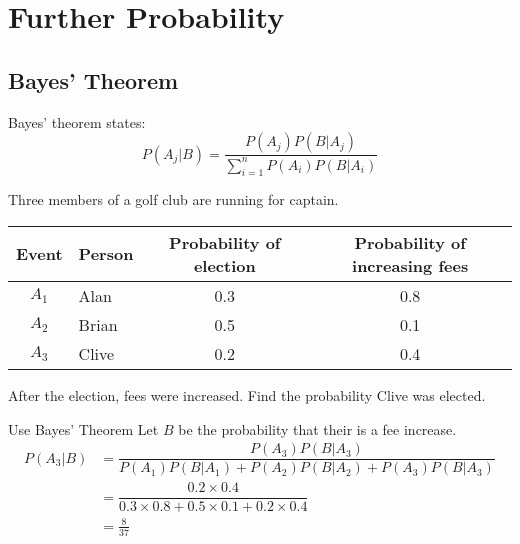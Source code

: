 
    \section{Further Probability}
        \subsection{Bayes' Theorem}
            Bayes' theorem states:
            $$
            P(A_j|B) = \dfrac{P(A_j)P(B|A_j)}{\displaystyle\sum^n_{i=1}{P(A_i)P(B|A_i)}}
            $$

            \begin{example}
            {
                Three members of a golf club are running for captain.

                \begin{center}
                    \begin{tabular}{c|l|c|c}
                        Event & Person  & Probability of election & Probability of increasing fees \\
                        \hline
                        $A_1$ & Alan    & 0.3 & 0.8 \\
                        $A_2$ & Brian   & 0.5 & 0.1 \\
                        $A_3$ & Clive   & 0.2 & 0.4 \\
                    \end{tabular} 
                \end{center}

                After the election, fees were increased. Find the probability Clive was elected. 
            }

            \begin{step}{Use Bayes' Theorem}
                Let $B$ be the probability that their is a fee increase.
                \begin{align*}
                    P(A_3|B) &= \dfrac{P(A_3)P(B|A_3)}{P(A_1)P(B|A_1)+P(A_2)P(B|A_2)+P(A_3)P(B|A_3)}    \\
                             &= \dfrac{0.2\times0.4}{0.3\times0.8+0.5\times0.1+0.2\times0.4}            \\
                             &= \frac{8}{37}
                \end{align*}
            \end{step}

            \end{example}

